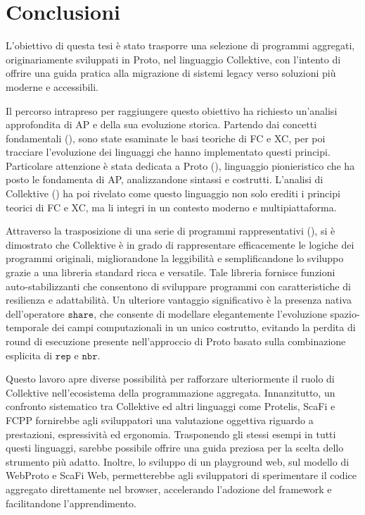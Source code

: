 \chapter{Conclusioni}
\label{sec:conclusions}

L'obiettivo di questa tesi è stato trasporre una selezione di programmi aggregati, originariamente sviluppati in Proto, nel linguaggio Collektive, con l'intento di offrire una guida pratica alla migrazione di sistemi legacy verso soluzioni più moderne e accessibili. 

Il percorso intrapreso per raggiungere questo obiettivo ha richiesto un'analisi approfondita di \ac{AP} e della sua evoluzione storica. Partendo dai concetti fondamentali (), sono state esaminate le basi teoriche di \ac{FC} e \ac{XC}, per poi tracciare l'evoluzione dei linguaggi che hanno implementato questi principi. Particolare attenzione è stata dedicata a Proto (), linguaggio pionieristico che ha posto le fondamenta di \ac{AP}, analizzandone sintassi e costrutti. L'analisi di Collektive () ha poi rivelato come questo linguaggio non solo erediti i principi teorici di \ac{FC} e XC, ma li integri in un contesto moderno e multipiattaforma.

Attraverso la trasposizione di una serie di programmi rappresentativi (), si è dimostrato che Collektive è in grado di rappresentare efficacemente le logiche dei programmi originali, migliorandone la leggibilità e semplificandone lo sviluppo grazie a una libreria standard ricca e versatile. Tale libreria fornisce funzioni auto-stabilizzanti che consentono di sviluppare programmi con caratteristiche di resilienza e adattabilità. Un ulteriore vantaggio significativo è la presenza nativa dell'operatore $\texttt{share}$, che consente di modellare elegantemente l'evoluzione spazio-temporale dei campi computazionali in un unico costrutto, evitando la perdita di round di esecuzione presente nell'approccio di Proto basato sulla combinazione esplicita di $\texttt{rep}$ e $\texttt{nbr}$.

Questo lavoro apre diverse possibilità per rafforzare ulteriormente il ruolo di Collektive nell'ecosistema della programmazione aggregata. Innanzitutto, un confronto sistematico tra Collektive ed altri linguaggi come Protelis, ScaFi e FCPP fornirebbe agli sviluppatori una valutazione oggettiva riguardo a prestazioni, espressività ed ergonomia. Trasponendo gli stessi esempi in tutti questi linguaggi, sarebbe possibile offrire una guida preziosa per la scelta dello strumento più adatto. Inoltre, lo sviluppo di un playground web, sul modello di WebProto e ScaFi Web, permetterebbe agli sviluppatori di sperimentare il codice aggregato direttamente nel browser, accelerando l’adozione del framework e facilitandone l’apprendimento.

